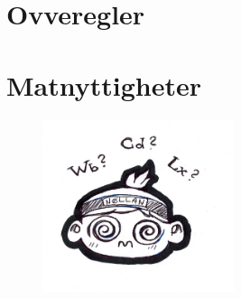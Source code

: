 














\chapter{Ovveregler}



\newpage


\chapter{Matnyttigheter}


\begin{figure}[H]
    \centering
    \includegraphics[width=0.5\textwidth]{nollan_vaaa.png}
\end{figure}






